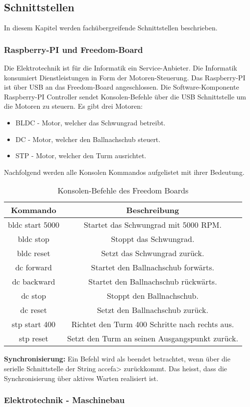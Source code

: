 \subsection{Schnittstellen}
In diesem Kapitel werden fachübergreifende Schnittstellen beschrieben.

\subsubsection{Raspberry-PI und Freedom-Board}
\label{sec:schnittstelle-raspi-freedom}
Die Elektrotechnik ist für die Informatik ein Service-Anbieter. Die Informatik konsumiert Dienstleistungen in Form der Motoren-Steuerung. Das Raspberry-PI ist über USB an das Freedom-Board angeschlossen. Die Software-Komponente Raspberry-PI Controller sendet Konsolen-Befehle über die USB Schnittstelle um die Motoren zu steuern. Es gibt drei Motoren:

\begin{itemize}
	\item BLDC - Motor, welcher das Schwungrad betreibt.
	\item DC - Motor, welcher den Ballnachschub steuert.
	\item STP - Motor, welcher den Turm ausrichtet.
\end{itemize}

\noindent
Nachfolgend werden alle Konsolen Kommandos aufgelistet mit ihrer Bedeutung. \\

\begin{table}[h!]
	\centering
	\begin{tabular}{|c|c|}
		\hline \textbf{Kommando}  & \textbf{Beschreibung} \\ 
		\hline bldc start 5000  & Startet das Schwungrad mit 5000 RPM. \\ 
		\hline bldc stop & Stoppt das Schwungrad.  \\ 
		\hline bldc reset & Setzt das Schwungrad zurück. \\ 
		\hline dc forward & Startet den Ballnachschub forwärts. \\ 
		\hline dc backward & Startet den Ballnachschub rückwärts. \\ 
		\hline dc stop & Stoppt den Ballnachschub. \\ 
	    \hline dc reset & Setzt den Ballnachschub zurück. \\ 
	    \hline stp start 400 & Richtet den Turm 400 Schritte nach rechts aus. \\ 
	    \hline stp reset & Setzt den Turm an seinen Ausgangspunkt zurück. \\ 
		\hline 
	\end{tabular} 
	\caption{Konsolen-Befehle des Freedom Boards}
	\label{tab:freedom-board-konsolen-befehle}
\end{table}

\noindent
\textbf{Synchronisierung:} Ein Befehl wird als beendet betrachtet, wenn über die serielle Schnittstelle der String accefa> zurückkommt. Das heisst, dass die Synchronisierung über aktives Warten realisiert ist.

\subsubsection{Elektrotechnik - Maschinebau}